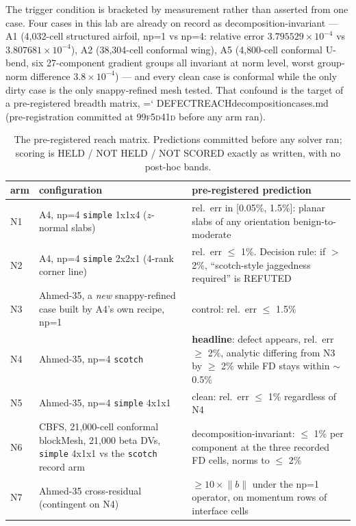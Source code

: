 \documentclass[11pt,a4paper]{article}
\newcommand{\artifact}[1]{{\small\ttfamily\hyphenchar\font=`\-\relax
  \def\_{\textunderscore\allowbreak}#1}}
\newcommand{\commit}[1]{\textsc{\small #1}}
\begin{document}
The trigger condition is bracketed by measurement rather than asserted from one case. Four
cases in this lab are already on record as decomposition-invariant --- A1 (4{,}032-cell
structured airfoil, np=1 vs np=4: relative error \(3.795529\times10^{-4}\) vs
\(3.807681\times10^{-4}\)), A2 (38{,}304-cell conformal wing), A5 (4{,}800-cell conformal
U-bend, six 27-component gradient groups all invariant at norm level, worst group-norm
difference \(3.8\times10^{-4}\)) --- and every clean case is conformal while the only dirty
case is the only snappy-refined mesh tested. That confound is the target of a
pre-registered breadth matrix, \artifact{DEFECT\_REACH\_decomposition\_cases.md}
(pre-registration committed at \commit{99f5d41d} before any arm ran).

\begin{table}[htbp]
\centering\small
\begin{tabular}{@{}lL{5.0cm}L{7.6cm}@{}}
\toprule
arm & configuration & pre-registered prediction \\
\midrule
N1 & A4, np=4 \texttt{simple} 1x1x4 ($z$-normal slabs) & rel.\ err in [0.05\%, 1.5\%]: planar slabs of any orientation benign-to-moderate \\
N2 & A4, np=4 \texttt{simple} 2x2x1 (4-rank corner line) & rel.\ err \(\le\) 1\%. Decision rule: if \(>\) 2\%, ``scotch-style jaggedness required'' is REFUTED \\
N3 & Ahmed-35, a \emph{new} snappy-refined case built by A4's own recipe, np=1 & control: rel.\ err \(\le\) 1.5\% \\
N4 & Ahmed-35, np=4 \texttt{scotch} & \textbf{headline}: defect appears, rel.\ err \(\ge\) 2\%, analytic differing from N3 by \(\ge\) 2\% while FD stays within \(\sim\)0.5\% \\
N5 & Ahmed-35, np=4 \texttt{simple} 4x1x1 & clean: rel.\ err \(\le\) 1\% regardless of N4 \\
N6 & CBFS, 21{,}000-cell conformal blockMesh, 21{,}000 beta DVs, \texttt{simple} 4x1x1 vs the \texttt{scotch} record arm & decomposition-invariant: \(\le\) 1\% per component at the three recorded FD cells, norms to \(\le\) 2\% \\
N7 & Ahmed-35 cross-residual (contingent on N4) & \(\ge 10\times\lVert b\rVert\) under the np=1 operator, on momentum rows of interface cells \\
\bottomrule
\end{tabular}
\caption{The pre-registered reach matrix. Predictions committed before any solver ran;
scoring is HELD / NOT HELD / NOT SCORED exactly as written, with no post-hoc bands.}
\end{table}
\end{document}
